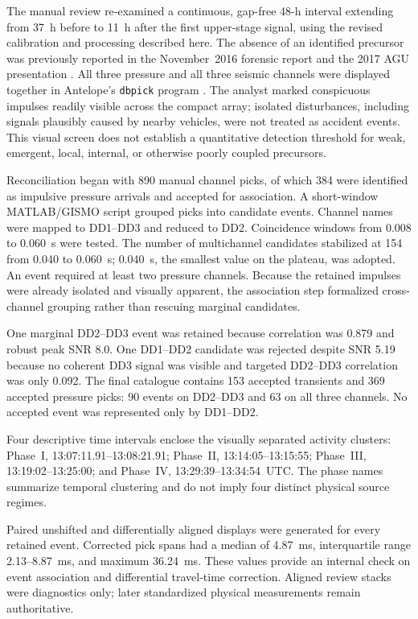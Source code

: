 \documentclass[]{seismica}
\begin{document}
The manual review re-examined a continuous, gap-free 48-h interval extending
from 37~h before to 11~h after the first upper-stage signal, using the revised
calibration and processing described here. The absence of an identified
precursor was previously reported in the November~2016 forensic report
\citep{thompson_mcnutt_fireball_2016} and the 2017 AGU presentation
\citep{thompson_agu_falcon9_2017}. All three pressure and all three seismic
channels were displayed together in Antelope's \texttt{dbpick} program
\citep{brtt_antelope}. The analyst marked conspicuous impulses readily visible
across the compact array; isolated disturbances, including signals plausibly
caused by nearby vehicles, were not treated as accident events. This visual
screen does not establish a quantitative detection threshold for weak,
emergent, local, internal, or otherwise poorly coupled precursors.

Reconciliation began with 890 manual channel picks, of which 384 were
identified as impulsive pressure arrivals and accepted for association. A short-window MATLAB/GISMO script
\citep{thompson_gismo_2017} grouped picks into candidate events. Channel names
were mapped to DD1--DD3 and reduced to
DD2. Coincidence windows from 0.008 to 0.060~s were tested. The number of
multichannel candidates stabilized at 154 from 0.040 to 0.060~s; 0.040~s, the
smallest value on the plateau, was adopted. An event required at least two
pressure channels. Because the retained impulses were already isolated and
visually apparent, the association step formalized cross-channel grouping
rather than rescuing marginal candidates.

One marginal DD2--DD3 event was retained because correlation was 0.879 and
robust peak SNR 8.0. One DD1--DD2 candidate was rejected despite SNR 5.19
because no coherent DD3 signal was visible and targeted DD2--DD3 correlation
was only 0.092. The final catalogue contains 153 accepted transients and 369
accepted pressure picks: 90 events on DD2--DD3 and 63 on all three channels.
No accepted event was represented only by DD1--DD2.

Four descriptive time intervals enclose the visually separated activity
clusters: Phase~I, 13:07:11.91--13:08:21.91; Phase~II,
13:14:05--13:15:55; Phase~III, 13:19:02--13:25:00; and Phase~IV,
13:29:39--13:34:54~UTC. The phase names summarize temporal clustering and do
not imply four distinct physical source regimes.

Paired unshifted and differentially aligned displays were generated for every
retained event. Corrected pick spans had a median of 4.87~ms, interquartile
range 2.13--8.87~ms, and maximum 36.24~ms. These values provide an internal
check on event association and differential travel-time correction. Aligned
review stacks were diagnostics only; later standardized physical measurements
remain authoritative.
\end{document}
